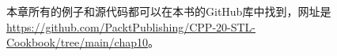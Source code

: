 



本章所有的例子和源代码都可以在本书的GitHub库中找到，网址是\url{https://github.com/PacktPublishing/CPP-20-STL-Cookbook/tree/main/chap10}。